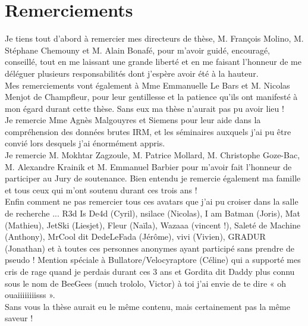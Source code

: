 \chapter*{Remerciements}

Je tiens tout d'abord à remercier mes directeurs de thèse, M. François Molino, M. Stéphane
Chemouny et M. Alain Bonafé, pour m'avoir guidé, encouragé, conseillé, tout en me laissant une
grande liberté et en me faisant l'honneur de me déléguer plusieurs responsabilités dont j'espère avoir
été à la hauteur.\\
Mes remerciements vont également à Mme Emmanuelle Le Bars et M. Nicolas Menjot de
Champfleur, pour leur gentillesse et la patience qu'ils ont manifesté à mon égard durant cette thèse.
Sans eux ma thèse n’aurait pas pu avoir lieu !\\
Je remercie Mme Agnès Malgouyres et Siemens pour leur aide dans la compréhension des
données brutes IRM, et les séminaires auxquels j’ai pu être convié lors desquels j’ai énormément
appris.\\
Je remercie M. Mokhtar Zagzoule, M. Patrice Mollard, M. Christophe Goze-Bac, M. Alexandre
Krainik et M. Emmanuel Barbier pour m'avoir fait l'honneur de participer au Jury de soutenance.
Bien entendu je remercie également ma famille et tous ceux qui m’ont soutenu durant ces
trois ans !\\
Enfin comment ne pas remercier tous ces avatars que j’ai pu croiser dans la salle de recherche
... R3d Is De4d (Cyril), nsilace (Nicolas), I am Batman (Joris), Mat (Mathieu), JetSki (Liesjet), Fleur (Naïla),
Wazaaa (vincent !), Saleté de Machine (Anthony), MrCool dit DedeLeFada (Jérôme), vivi (Vivien),
GRADUR (Jonathan) et à toutes ces personnes anonymes ayant participé sans prendre de pseudo !
Mention spéciale à Bullatore/Velocyraptore (Céline) qui a supporté mes cris de rage quand je perdais
durant ces 3 ans et Gordita dit Daddy plus connu sous le nom de BeeGees (much trololo, Victor) à toi
j’ai envie de te dire « oh ouaiiiiiiiisss ».\\
Sans vous la thèse aurait eu le même contenu, mais certainement pas la même saveur !
